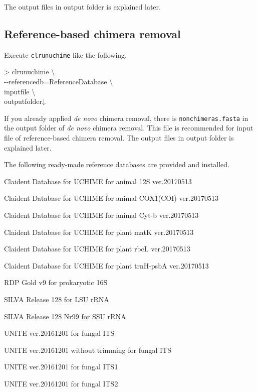 \documentclass[titlepage,10pt,a4paper,english]{jsbook}
\newenvironment{cmd}{\begin{oframed}\raggedright\ttfamily\footnotesize\setlength{\baselineskip}{1.4em}}{\end{oframed}\vspace{-1em}}
\begin{document}
The output files in output folder is explained later.

\subsection{Reference-based chimera removal}

Execute \texttt{clrunuchime} like the following.

\begin{cmd}
{\textgreater} clrunuchime {\textbackslash}\\
{-}{-}referencedb=ReferenceDatabase {\textbackslash}\\
inputfile {\textbackslash}\\
outputfolder↓
\end{cmd}

If you already applied \textit{de novo} chimera removal, there is \texttt{nonchimeras.fasta} in the output folder of \textit{de novo} chimera removal.
This file is recommended for input file of reference-based chimera removal.
The output files in output folder is explained later.

The following ready-made reference databases are provided and installed.

\begin{description}\small\setlength{\baselineskip}{1.1em}
\item[cdu12s] Claident Database for UCHIME for animal 12S ver.20170513
\item[cducox1] Claident Database for UCHIME for animal COX1(COI) ver.20170513
\item[cducytb] Claident Database for UCHIME for animal Cyt-b ver.20170513
\item[cdumatk] Claident Database for UCHIME for plant matK ver.20170513
\item[cdurbcl] Claident Database for UCHIME for plant rbcL ver.20170513
\item[cdutrnhpsba] Claident Database for UCHIME for plant trnH-psbA ver.20170513
\item[rdpgoldv9] RDP Gold v9 for prokaryotic 16S
\item[silva128LSUref] SILVA Release 128 for LSU rRNA
\item[silva128SSUrefnr99] SILVA Release 128 Nr99 for SSU rRNA
\item[unite20161201] UNITE ver.20161201 for fungal ITS
\item[unite20161201untrim] UNITE ver.20161201 without trimming for fungal ITS
\item[unite20161201its1] UNITE ver.20161201 for fungal ITS1
\item[unite20161201its2] UNITE ver.20161201 for fungal ITS2
\end{description}
\end{document}
